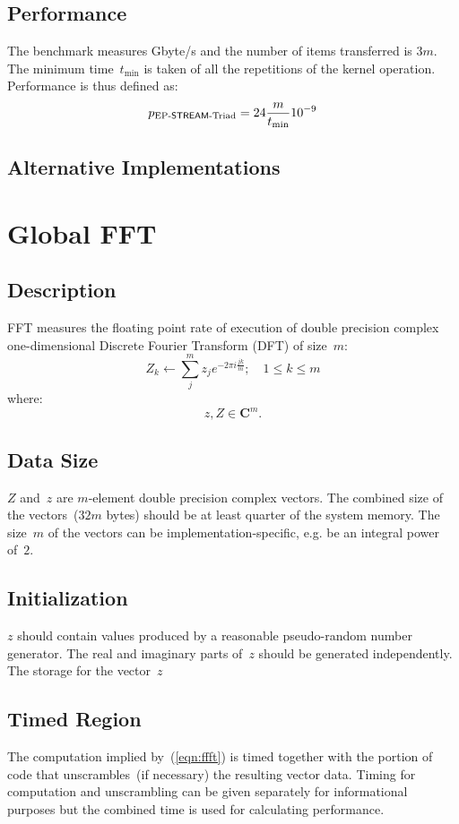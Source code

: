 \documentclass[twocolumn,draft]{article}
\newcommand{\FFT}{\textsf{FFT}\xspace}
\newcommand{\STREAM}{\textsf{STREAM}\xspace}
\begin{document}
\subsection{Performance}
The benchmark measures Gbyte/s and the number of items transferred is $3m$. The
minimum time~$t_{\min}$ is taken of all the repetitions of the kernel
operation. Performance is thus defined as:
\begin{equation}
  p_{\textrm{\scriptsize{}EP-\STREAM{}-Triad}} = 24\frac{m}{t_{\min}}10^{-9}
\end{equation}

\subsection{Alternative Implementations}

\section{Global \FFT}

\subsection{Description}
\FFT measures the floating point rate of execution of double precision
complex one-dimensional Discrete Fourier Transform (DFT) of size~$m$:
\begin{equation}
Z_k\leftarrow\sum_j^m z_j e^{-2\pi i\frac{jk}{m}}; \quad 1 \le k \le m
\label{eqn:ffft}
\end{equation}
where:
\[z, Z\in\mathbf{C}^m.\]

\subsection{Data Size}
$Z$ and~$z$ are $m$-element double precision complex vectors. The combined size
of the vectors~($32m$ bytes) should be at least quarter of the system memory.
The size~$m$ of the vectors can be implementation-specific, e.g. be an integral
power of~$2$.

\subsection{Initialization}
$z$ should contain values produced by a reasonable pseudo-random number
generator. The real and imaginary parts of~$z$ should be generated
independently. The storage for the vector~$z$

\subsection{Timed Region}
The computation implied by~(\ref{eqn:ffft}) is timed together with the portion
of code that unscrambles~(if necessary) the resulting vector data. Timing for
computation and unscrambling can be given separately for informational
purposes but the combined time is used for calculating performance.
\end{document}
